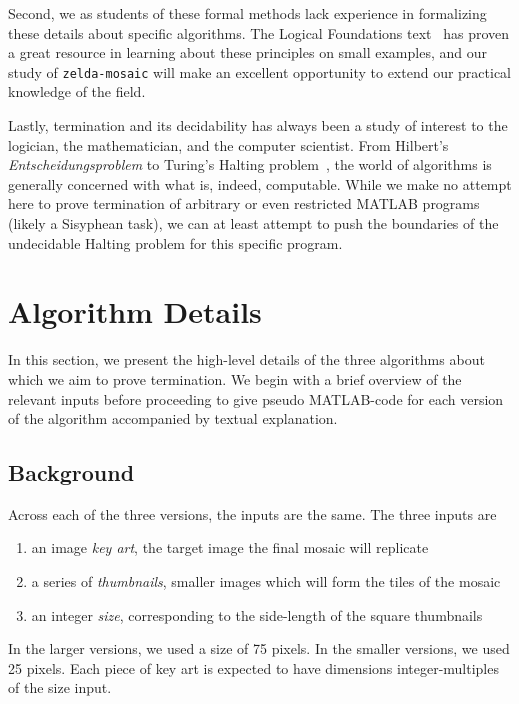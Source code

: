 \documentclass[11pt,conference]{IEEEtran}
\begin{document}
Second, we as students of these formal methods lack experience in formalizing
these details about specific algorithms. The Logical Foundations
text~\cite{Pierce:SF1} has proven a great resource in learning about these
principles on small examples, and our study of \texttt{zelda-mosaic} will make
an excellent opportunity to extend our practical knowledge of the field.

Lastly, termination and its decidability has always been a study of interest to
the logician, the mathematician, and the computer scientist. From Hilbert's
\textit{Entscheidungsproblem} to Turing's Halting problem~\cite{Cook_2011}, the
world of algorithms is generally concerned with what is, indeed, computable.
While we make no attempt here to prove termination of arbitrary or even
restricted MATLAB programs (likely a Sisyphean task), we can at least attempt to
push the boundaries of the undecidable Halting problem for this specific
program.

\section{Algorithm Details}\label{S:AlgDet}

In this section, we present the high-level details of the three algorithms about
which we aim to prove termination. We begin with a brief overview of the
relevant inputs before proceeding to give pseudo MATLAB-code for each version of
the algorithm accompanied by textual explanation.

\subsection{Background}

Across each of the three versions, the inputs are the same. The three inputs are

\begin{enumerate}
    \item an image \textit{key art}, the target image the final mosaic will
        replicate
    \item a series of \textit{thumbnails}, smaller images which will form the
        tiles of the mosaic
    \item an integer \textit{size}, corresponding to the side-length of the
        square thumbnails
\end{enumerate}

In the larger versions, we used a size of 75 pixels. In the smaller versions, we
used 25 pixels. Each piece of key art is expected to have dimensions
integer-multiples of the size input.
\end{document}
